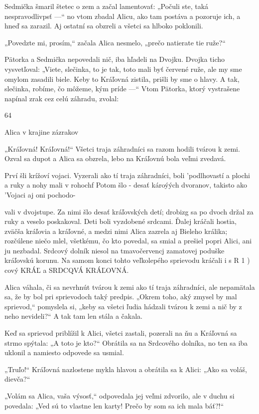 \documentclass[12pt]{book}
\begin{document}
\begin{Parallel}[p]{}{}
{Sedmička šmaril štetec o zem a začal lamentovať: „Počuli
ste, taká nespravodlivpsť —“ no vtom zbadal Alicu, ako tam
postáva a pozoruje ich, a hneď sa zarazil. Aj ostatní sa
obzreli a všetci sa hlboko poklonili.

„Povedzte mi, prosím,“ začala Alica nesmelo, „prečo
natierate tie ruže?“

Pätorka a Sedmička nepovedali nič, iba hľadeli na
Dvojku. Dvojka ticho vysvetľoval: „Viete, slečinka, to je
tak, toto mali byť červené ruže, ale my sme omylom zasadili
biele. Keby to Kráľovná zistila, prišli by sme o hlavy. A tak,
slečinka, robíme, čo môžeme, kým príde —“ Vtom Pätorka,
ktorý vystrašene napínal zrak cez celú záhradu, zvolal:

64

Alica v krajine zázrakov

„Kráľovná! Kráľovná!“ Všetci traja záhradníci sa razom
hodili tvárou k zemi. Ozval sa dupot a Alica sa obzrela, lebo
na Kráľovnú bola veľmi zvedavá.

Prví šli krížoví vojaci. Vyzerali ako tí traja záhradníci, boli
'podlhovastí a plochi a ruky a nohy mali v rohochf Potom šlo
- desať károýých dvoranov, takisto ako 'Vojaci aj oni pochodo-

vali v dvojstupe. Za nimi šlo desať kráľovských detí; drobizg
sa po dvoch držal za ruky a veselo poskakoval. Deti boli
vyzdobené srdcami. Ďalej kráčali hostia, zväčša kráľovia
a kráľovné, a medzi nimi Alica zazrela aj Bieleho králika;
rozčúlene niečo mlel, všetkému, čo kto povedal, sa smial
a prešiel popri Alici, ani ju nezbadal. Srdcový dolník niesol
na tmavočervencj zamatovej poduške kráľovskú korunu.
Na samom konci tohto veľkolepého sprievodu kráčali
i s R  1 )  cový KRÁĽ a SRDCQVÁ KRÁĽOVNÁ.

Alica váhala, či sa nevrhnút tvárou k zemi ako tí traja
záhradníci, ale nepamätala sa, že by bol pri sprievodoch taký
predpis. „Okrem toho, aký zmysel by mal sprievod,“
pomyslela si, „keby sa všetci ľudia hádzali tvárou k zemi
a nič by z neho nevideli?“ A tak tam len stála a čakala.

Keď sa sprievod priblížil k Alici, všetci zastali, pozerali na
ňu a Kráľovná sa strmo spýtala: „A toto je kto?“ Obrátila sa
na Srdcového dolníka, no ten sa iba uklonil a namiesto
odpovede sa usmial.

„Truľo!“ Kráľovná nazlostene mykla hlavou a obrátila sa
k Alici: „Ako sa voláš, dievča?“

„Volám sa Alica, vaša výsosť,“ odpovedala jej veľmi
zdvorilo, ale v duchu si povedala: „Ved sú to vlastne len
karty! Prečo by som sa ich mala báť?!“

}
\end{Parallel}
\end{document}

